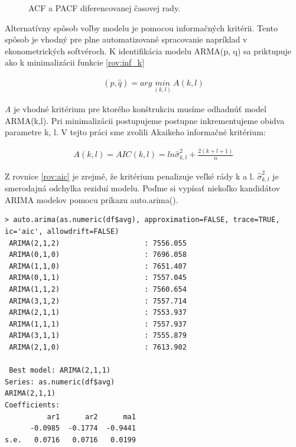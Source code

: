\documentclass[12pt,a4paper,oneside,final]{article}
\theoremstyle{definition}
\theoremstyle{remark}
\numberwithin{equation}{section}
\begin{document}
\begin{figure}[!tbo]
\begin{subfigure}[b]{0.45\textwidth}
        \label{obr:heap_diff_pacf}
    \end{subfigure}
    \caption{ACF a PACF diferencovanej časovej rady.}
    \label{fig:test}
\end{figure}

Alternatívny spôsob voľby modelu je pomocou informačných kritérii. Tento spôsob je
vhodný pre plne automatizované spracovanie \cite{cipra} napríklad v ekonometrických 
softvéroch. K identifikácia modelu ARMA(p, q) sa priktupuje ako k minimalizácii funkcie
\ref{rov:inf_k}

\begin{eqnarray} \label{rov:inf_k}
    (\hat{p}, \hat{q}) =arg\ \underset{(k,l)}{min}\ A(k, l)
\end{eqnarray}

\emph{A} je vhodné kritérium pre ktorého konštrukciu musíme odhadnúť model ARMA(k,l). Pri
minimalizácii postupujeme postupne inkrementujeme obidva parametre k, l.
V tejto práci sme zvolili Akaikeho informačné kritérium:

\begin{eqnarray} \label{rov:aic}
    A(k,l) = AIC(k,l) = ln\hat{\sigma}^{2}_{k,l} + \frac{2(k+l+1)}{n}
\end{eqnarray}

Z rovnice \ref{rov:aic} je zrejmé, že kritérium penalizuje veľké rády k a l. 
$\hat{\sigma}^{2}_{k,l}$ je smerodajná odchylka reziduí modelu. 
Poďme si vypísať niekoľko kandidátov ARIMA modelov pomocu príkazu auto.arima().

\begin{minipage}{\linewidth}
\begingroup
\fontsize{9pt}{7pt}\selectfont
\begin{verbatim}
> auto.arima(as.numeric(df$avg), approximation=FALSE, trace=TRUE, ic='aic', allowdrift=FALSE)
 ARIMA(2,1,2)                    : 7556.055
 ARIMA(0,1,0)                    : 7696.058
 ARIMA(1,1,0)                    : 7651.407
 ARIMA(0,1,1)                    : 7557.045
 ARIMA(1,1,2)                    : 7560.654
 ARIMA(3,1,2)                    : 7557.714
 ARIMA(2,1,1)                    : 7553.937
 ARIMA(1,1,1)                    : 7557.937
 ARIMA(3,1,1)                    : 7555.879
 ARIMA(2,1,0)                    : 7613.902

 Best model: ARIMA(2,1,1)                    
Series: as.numeric(df$avg) 
ARIMA(2,1,1)                    
Coefficients:
          ar1      ar2      ma1
      -0.0985  -0.1774  -0.9441
s.e.   0.0716   0.0716   0.0199
\end{verbatim}
\endgroup
\end{minipage}
\end{document}
